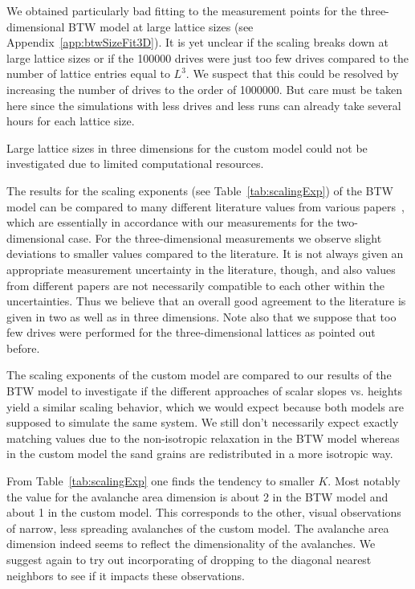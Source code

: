 We obtained particularly bad fitting to the measurement points for the three-dimensional BTW model at large lattice
sizes (see Appendix~\ref{app:btwSizeFit3D}). It is yet unclear if the scaling breaks down at large lattice sizes or
if the \num{100000} drives were just too few drives compared to the number of lattice entries equal to $L^3$.
We suspect that this could be resolved by increasing the number of drives to the order of \num{1000000}.
But care must be taken here since the simulations with less drives and less runs can already take several hours
for each lattice size.

Large lattice sizes in three dimensions for the custom model could not be investigated due to limited computational
resources.

The results for the scaling exponents (see Table~\ref{tab:scalingExp}) of the BTW model can be compared to many
different literature values from various papers~\cite{SOC-book}, which are essentially in accordance with our
measurements for the two-dimensional case. For the three-dimensional measurements we observe slight deviations to
smaller values compared to the literature. It is not always given an appropriate measurement uncertainty in the
literature, though, and also values from different papers are not necessarily compatible to each other
within the uncertainties. Thus we believe that an overall good agreement to the literature is given in two as well as
in three dimensions. Note also that we suppose that too few drives were performed for the three-dimensional
lattices as pointed out before.

The scaling exponents of the custom model are compared to our results of the BTW model to investigate if the different
approaches of scalar slopes vs. heights yield a similar scaling behavior, which we would expect because both models
are supposed to simulate the same system. We still don't necessarily expect exactly matching values due to the
non-isotropic relaxation in the BTW model whereas in the custom model the sand grains are redistributed in a more
isotropic way.

From Table~\ref{tab:scalingExp} one finds the tendency to smaller $K$. Most notably the value for the avalanche area
dimension is about \num{2} in the BTW model and about \num{1} in the custom model. This corresponds to the other,
visual observations of narrow, less spreading avalanches of the custom model.
The avalanche area dimension indeed seems to reflect the dimensionality of the avalanches.
We suggest again to try out incorporating of dropping to the diagonal nearest neighbors to see if it impacts these
observations.

